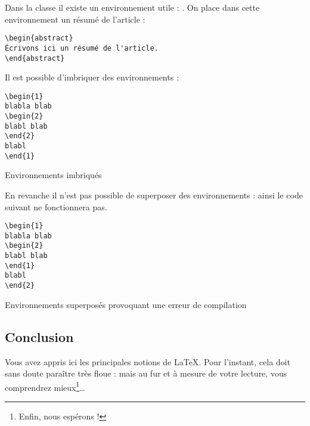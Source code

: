 Dans la classe  il existe un environnement utile : . On place dans cette environnement un résumé de l'article :

\begin{verbatim}
\begin{abstract}
Écrivons ici un résumé de l'article. 
\end{abstract}
\end{verbatim}


Il est possible d'imbriquer des environnements :
\begin{listing}[ht]
\begin{verbatim}
\begin{1}
blabla blab
\begin{2}
blabl blab
\end{2}
blabl
\end{1}
\end{verbatim}
\caption{Environnements imbriqués}
\end{listing}
\FloatBarrier
En revanche il n'est pas possible de superposer des environnements : ainsi le code suivant ne fonctionnera pas.

\begin{listing}[ht]
\begin{verbatim}
\begin{1}
blabla blab
\begin{2}
blabl blab
\end{1}
blabl
\end{2}
\end{verbatim}
\caption{Environnements superposés provoquant une erreur de compilation}
\end{listing}
\FloatBarrier
\subsection{Conclusion}

Vous avez appris ici les principales notions de \LaTeX. Pour l'instant, cela doit sans doute paraître très floue : mais au fur et à mesure de votre lecture, vous comprendrez mieux\footnote{Enfin, nous espérons !}\ldots



